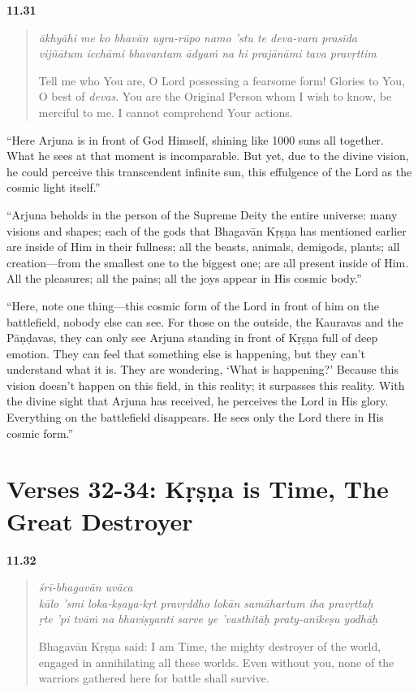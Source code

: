 \par\noindent\textbf{11.31}\par
\begin{verse}
\textit{ākhyāhi me ko bhavān ugra-rūpo namo ’stu te deva-vara prasīda} \\
\textit{vijñātum icchāmi bhavantam ādyaṁ na hi prajānāmi tava pravṛttim}

\noindent Tell me who You are, O Lord possessing a fearsome form! Glories to You, O best of \textit{devas}. You are the Original Person whom I wish to know, be merciful to me. I cannot comprehend Your actions.
\end{verse}
\par


\enquote{Here Arjuna is in front of God Himself, shining like 1000 suns all together. What he sees at that moment is incomparable. But yet, due to the divine vision, he could perceive this transcendent infinite sun, this effulgence of the Lord as the cosmic light itself.}

\enquote{Arjuna beholds in the person of the Supreme Deity the entire universe: many visions and shapes; each of the gods that Bhagavān Kṛṣṇa has mentioned earlier are inside of Him in their fullness; all the beasts, animals, demigods, plants; all creation---from the smallest one to the biggest one; are all present inside of Him. All the pleasures; all the pains; all the joys appear in His cosmic body.}

\enquote{Here, note one thing---this cosmic form of the Lord in front of him on the battlefield, nobody else can see. For those on the outside, the Kauravas and the Pāṇḍavas, they can only see Arjuna standing in front of Kṛṣṇa full of deep emotion. They can feel that something else is happening, but they can’t understand what it is. They are wondering, \enquote{What is happening?} Because this vision doesn’t happen on this field, in this reality; it surpasses this reality. With the divine sight that Arjuna has received, he perceives the Lord in His glory. Everything on the battlefield disappears. He sees only the Lord there in His cosmic form.}

\section{Verses 32-34: Kṛṣṇa is Time, The Great Destroyer}\label{sec-verses-32-34-krsna-is-time-the-great-destroyer}


\par\noindent\textbf{11.32}\par
\begin{verse}
\textit{śrī-bhagavān uvāca} \\
\textit{kālo ’smi loka-kṣaya-kṛt pravṛddho lokān samāhartum iha pravṛttaḥ} \\
\textit{ṛte ’pi tvāṁ na bhaviṣyanti sarve ye ’vasthitāḥ praty-anīkeṣu yodhāḥ}

\noindent Bhagavān Kṛṣṇa said: I am Time, the mighty destroyer of the world, engaged in annihilating all these worlds. Even without you, none of the warriors gathered here for battle shall survive.
\end{verse}
\par



